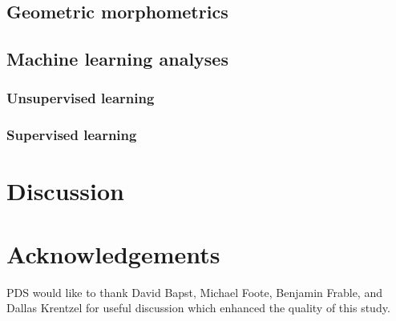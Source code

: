 \documentclass[12pt]{article}\usepackage{graphicx, color}
\begin{document}
\subsection{Geometric morphometrics}

\subsection{Machine learning analyses}
\subsubsection{Unsupervised learning}

\subsubsection{Supervised learning}


\section{Discussion}


\section*{Acknowledgements}
PDS would like to thank David Bapst, Michael Foote, Benjamin Frable, and Dallas Krentzel for useful discussion which enhanced the quality of this study.



\end{document}
